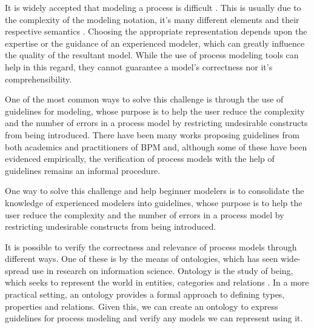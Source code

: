 \documentclass{llncs}
\begin{document}
It is widely accepted that modeling a process is difficult \cite{7PMG}. This is usually due to the complexity of the modeling notation, it's many different elements and their respective semantics \cite{What we can learn from Quality Issues of BPMN Models from Industry}. Choosing the appropriate representation depends upon the expertise or the guidance of an experienced modeler, which can greatly influence the quality of the resultant model. While the use of process modeling tools can help in this regard, they cannot guarantee a model's correctness nor it's comprehensibility.


One of the most common ways to solve this challenge is through the use of guidelines for modeling, whose purpose is to help the user reduce the complexity and the number of errors in a process model by restricting undesirable constructs from being introduced. There have been many works proposing guidelines from both academics \cite{Mendling and Others} and practitioners of BPM \cite{Silver and Others} and, although some of these have been evidenced empirically, the verification of process models with the help of guidelines remains an informal procedure.

One way to solve this challenge and help beginner modelers is to consolidate the knowledge of experienced modelers into guidelines, whose purpose is to help the user reduce the complexity and the number of errors in a process model by restricting undesirable constructs from being introduced.

It is possible to verify the correctness and relevance of process models through different ways. One of these is by the means of ontologies, which has seen wide-spread use in research on information science. Ontology is the study of being, which seeks to represent the world in entities, categories and relations \cite{Mendling2008}. In a more practical setting, an ontology provides a formal approach to defining types, properties and relations. Given this, we can create an ontology to express guidelines for process modeling and verify any models we can represent using it.
\end{document}
